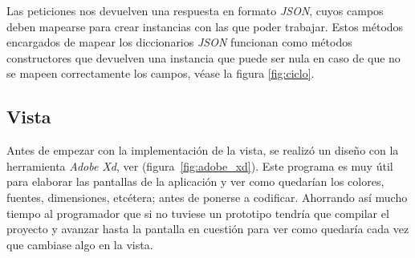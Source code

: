 Las peticiones nos devuelven una respuesta en formato \textit{JSON}, cuyos campos deben mapearse para crear instancias con las que poder trabajar. Estos métodos encargados de mapear los diccionarios \textit{JSON} funcionan como métodos constructores que devuelven una instancia que puede ser nula en caso de que no se mapeen correctamente los campos, véase la figura \ref{fig:ciclo}.

\subsection{Vista}
Antes de empezar con la implementación de la vista, se realizó un diseño con la herramienta \textit{Adobe Xd}, ver (figura~\ref{fig:adobe_xd}). Este programa es muy útil para elaborar las pantallas de la aplicación y ver como quedarían los colores, fuentes, dimensiones, etcétera; antes de ponerse a codificar. Ahorrando así mucho tiempo al programador que si no tuviese un prototipo tendría que compilar el proyecto y avanzar hasta la pantalla en cuestión para ver como quedaría cada vez que cambiase algo en la vista.

